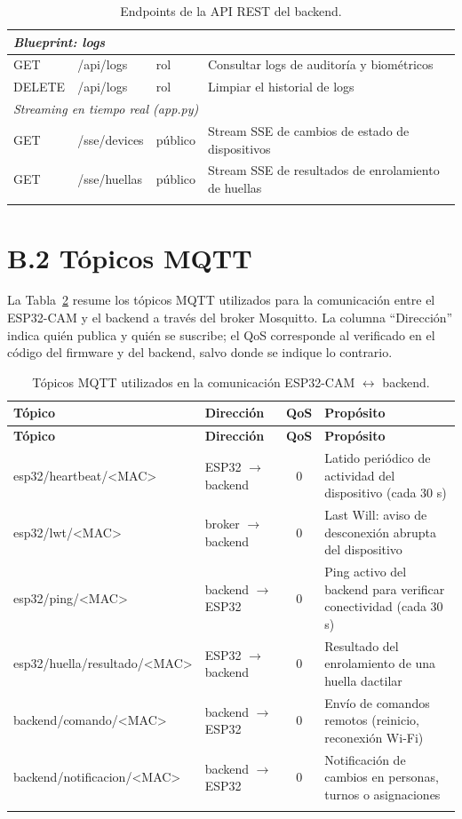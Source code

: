 \documentclass{iccmemoria}
\begin{document}
\begin{longtable}{|p{1.5cm}|p{5.2cm}|p{1.2cm}|p{5.3cm}|}
\multicolumn{4}{|l|}{\textit{Blueprint: logs}} \\
\hline
GET & /api/logs & rol & Consultar logs de auditoría y biométricos \\
DELETE & /api/logs & rol & Limpiar el historial de logs \\
\hline

\multicolumn{4}{|l|}{\textit{Streaming en tiempo real (app.py)}} \\
\hline
GET & /sse/devices & público & Stream SSE de cambios de estado de dispositivos \\
GET & /sse/huellas & público & Stream SSE de resultados de enrolamiento de huellas \\
\hline
\caption{Endpoints de la API REST del backend.}
\label{tab:endpoints_rest}
\end{longtable}

\section*{B.2 Tópicos MQTT}

La Tabla~\ref{tab:topicos_mqtt} resume los tópicos MQTT utilizados para la comunicación entre el ESP32-CAM y el backend a través del broker Mosquitto. La columna ``Dirección'' indica quién publica y quién se suscribe; el QoS corresponde al verificado en el código del firmware y del backend, salvo donde se indique lo contrario.

\small
\begin{longtable}{|p{4.0cm}|p{2.3cm}|c|p{5.7cm}|}
\hline
\textbf{Tópico} & \textbf{Dirección} & \textbf{QoS} & \textbf{Propósito} \\
\hline
\endfirsthead
\hline
\textbf{Tópico} & \textbf{Dirección} & \textbf{QoS} & \textbf{Propósito} \\
\hline
\endhead

esp32/\allowbreak heartbeat/\allowbreak <MAC> & ESP32 \(\rightarrow\) backend & 0 & Latido periódico de actividad del dispositivo (cada 30 s) \\
esp32/\allowbreak lwt/\allowbreak <MAC> & broker \(\rightarrow\) backend & 0 & Last Will: aviso de desconexión abrupta del dispositivo \\
esp32/\allowbreak ping/\allowbreak <MAC> & backend \(\rightarrow\) ESP32 & 0 & Ping activo del backend para verificar conectividad (cada 30 s) \\
esp32/\allowbreak huella/\allowbreak resultado/\allowbreak <MAC> & ESP32 \(\rightarrow\) backend & 0 & Resultado del enrolamiento de una huella dactilar \\
backend/\allowbreak comando/\allowbreak <MAC> & backend \(\rightarrow\) ESP32 & 0 & Envío de comandos remotos (reinicio, reconexión Wi-Fi) \\
backend/\allowbreak notificacion/\allowbreak <MAC> & backend \(\rightarrow\) ESP32 & 0 & Notificación de cambios en personas, turnos o asignaciones \\
\hline
\caption{Tópicos MQTT utilizados en la comunicación ESP32-CAM \(\leftrightarrow\) backend.}
\label{tab:topicos_mqtt}
\end{longtable}
\end{document}
